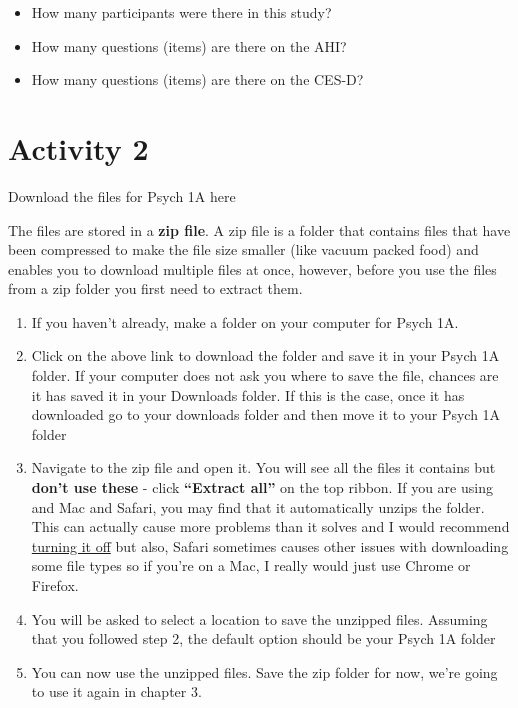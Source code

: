 \documentclass[
  oneside]{book}
\providecommand{\tightlist}{%
  \setlength{\itemsep}{0pt}\setlength{\parskip}{0pt}}
\begin{document}
\begin{itemize}
\tightlist
\item
  How many participants were there in this study?
\end{itemize}

\begin{itemize}
\tightlist
\item
  How many questions (items) are there on the AHI?
\end{itemize}

\begin{itemize}
\tightlist
\item
  How many questions (items) are there on the CES-D?
\end{itemize}

\hypertarget{activity-2}{%
\section{Activity 2}\label{activity-2}}

Download the files for Psych 1A here

The files are stored in a \textbf{zip file}. A zip file is a folder that contains files that have been compressed to make the file size smaller (like vacuum packed food) and enables you to download multiple files at once, however, before you use the files from a zip folder you first need to extract them.

\begin{enumerate}
\def\labelenumi{\arabic{enumi}.}
\tightlist
\item
  If you haven't already, make a folder on your computer for Psych 1A.
\item
  Click on the above link to download the folder and save it in your Psych 1A folder. If your computer does not ask you where to save the file, chances are it has saved it in your Downloads folder. If this is the case, once it has downloaded go to your downloads folder and then move it to your Psych 1A folder
\item
  Navigate to the zip file and open it. You will see all the files it contains but \textbf{don't use these} - click \textbf{``Extract all''} on the top ribbon. If you are using and Mac and Safari, you may find that it automatically unzips the folder. This can actually cause more problems than it solves and I would recommend \href{https://apple.stackexchange.com/questions/961/how-to-stop-safari-from-unzipping-files-after-download}{turning it off} but also, Safari sometimes causes other issues with downloading some file types so if you're on a Mac, I really would just use Chrome or Firefox.
\item
  You will be asked to select a location to save the unzipped files. Assuming that you followed step 2, the default option should be your Psych 1A folder
\item
  You can now use the unzipped files. Save the zip folder for now, we're going to use it again in chapter 3.
\end{enumerate}
\end{document}
